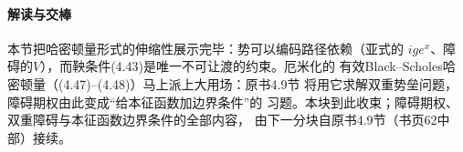 \paragraph{解读与交棒}
本节把哈密顿量形式的伸缩性展示完毕：势可以编码路径依赖（亚式的
$ige^{x}$、障碍的$V$），而鞅条件(4.43)是唯一不可让渡的约束。厄米化的
有效Black--Scholes哈密顿量（(4.47)--(4.48)）马上派上大用场：原书4.9节
将用它求解双重势垒问题，障碍期权由此变成“给本征函数加边界条件”的
习题。本块到此收束；障碍期权、双重障碍与本征函数边界条件的全部内容，
由下一分块自原书4.9节（书页62中部）接续。


